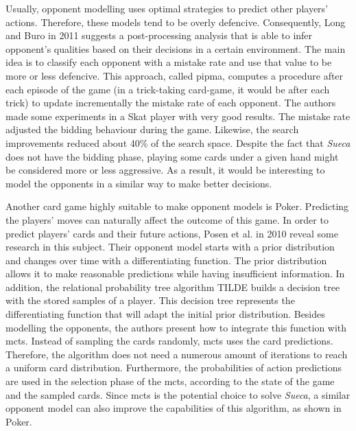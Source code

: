 Usually, opponent modelling uses optimal strategies to predict other players' actions.
Therefore, these models tend to be overly defencive.
Consequently, Long and Buro in 2011 \cite{Long2009} suggests a post-processing analysis that is able to infer opponent's qualities based on their decisions in a certain environment.
The main idea is to classify each opponent with a mistake rate and use that value to be more or less defencive.
This approach, called \gls{pipma}, computes a procedure after each episode of the game (in a trick-taking card-game, it would be after each trick) to update incrementally the mistake rate of each opponent.
The authors made some experiments in a Skat player with very good results.
The mistake rate adjusted the bidding behaviour during the game.
Likewise, the search improvements reduced about 40\% of the search space.
Despite the fact that \emph{Sueca} does not have the bidding phase, playing some cards under a given hand might be considered more or less aggressive.
As a result, it would be interesting to model the opponents in a similar way to make better decisions.

Another card game highly suitable to make opponent models is Poker.
Predicting the players' moves can naturally affect the outcome of this game.
In order to predict players' cards and their future actions, Posen et al. in 2010 \cite{Ponsen2008} reveal some research in this subject.
Their opponent model starts with a prior distribution and changes over time with a differentiating function.
The prior distribution allows it to make reasonable predictions while having insufficient information.
In addition, the relational probability tree algorithm TILDE builds a decision tree with the stored samples of a player.
This decision tree represents the differentiating function that will adapt the initial prior distribution.
Besides modelling the opponents, the authors present how to integrate this function with \gls{mcts}.
Instead of sampling the cards randomly, \gls{mcts} uses the card predictions.
Therefore, the algorithm does not need a numerous amount of iterations to reach a uniform card distribution.
Furthermore, the probabilities of action predictions are used in the selection phase of the \gls{mcts}, according to the state of the game and the sampled cards.
Since \gls{mcts} is the potential choice to solve \emph{Sueca}, a similar opponent model can also improve the capabilities of this algorithm, as shown in Poker.

 